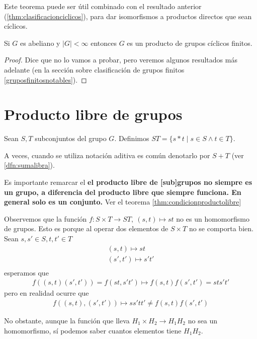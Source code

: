 Este teorema puede ser útil combinado con el resultado anterior (\autoref{thm:clasificacionciclicos}), para dar isomorfismos a productos directos que sean cíclicos.

\begin{thm}
	\label{thm:noprobado1}
	Si $G$ es abeliano y $|G| < \infty$ entonces $G$ es un producto de grupos cíclicos finitos.
\end{thm}

\begin{proof}
	Dice que no lo vamos a probar, pero veremos algunos resultados más adelante (en la sección sobre clasificación de grupos finitos \ref{gruposfinitosnotables}).
\end{proof}


\section{Producto libre de grupos}

\begin{dfn}
	\label{dfn:productolibre}
	Sean $S,T$ subconjuntos del grupo $G$. Definimos $ST = \{s\ast t \mid s \in S \land t \in T\}$.
\end{dfn}

A veces, cuando se utiliza notación aditiva es común denotarlo por $S+T$ (ver \autoref{dfn:sumalibra}).

Es importante remarcar el \textbf{el producto libre de [sub]grupos no siempre es un grupo, a diferencia del producto libre que siempre funciona. En general solo es un conjunto.} Ver el teorema \ref{thm:condicionproductolibre}

Observemos que la función $f: S \times T \to ST,\ (s,t) \mapsto st$ no es un homomorfismo de grupos. Esto es porque al operar dos elementos de $S \times T$ no se comporta bien. Sean $s,s'\in S, t,t'\in T$
\begin{align*}
(s,t) \mapsto st \\
(s',t') \mapsto s't' \\
\end{align*}
esperamos que 
\begin{align*}
f((s,t)(s',t')) = f(st, s't') \mapsto f(s,t)f(s',t') = sts't'
\end{align*}
pero en realidad ocurre que
\begin{align*}
f((s,t),(s',t')) \mapsto ss'tt' \neq f(s,t)f(s',t')
\end{align*}

No obstante, aunque la función que lleva $H_1 \times H_2 \to H_1 H_2$ no sea un homomorfismo, sí podemos saber cuantos elementos tiene $H_1H_2$.

